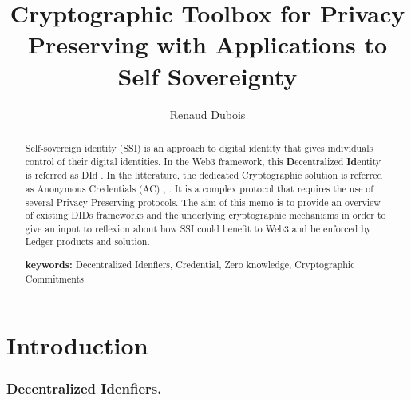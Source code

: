 \documentclass[11pt]{llncs2e/llncs}
\begin{document}
\title{Cryptographic Toolbox for Privacy Preserving with Applications to Self Sovereignty}
 
   \author{
    Renaud Dubois}
  


\maketitle


\begin{abstract}

Self-sovereign identity (SSI) is an approach to digital identity that gives individuals control of their digital identities. In the Web3 framework, this {\bf D}ecentralized {\bf Id}entity is referred as DId \cite{W3CDId21}. In the litterature, the dedicated Cryptographic solution is referred as Anonymous Credentials (AC) \cite{CL02}, \cite{CL04}. It is a complex protocol that requires the use of several Privacy-Preserving protocols. 
The aim of this memo is to provide an overview of existing DIDs frameworks and the underlying cryptographic mechanisms in order to give an input to reflexion about how SSI could benefit to Web3 and be enforced by Ledger products and solution. 

{\bf keywords:}{  Decentralized Idenfiers,  Credential, Zero knowledge, Cryptographic Commitments}
\end{abstract}

\section*{Introduction}

\subsubsection{Decentralized Idenfiers.}
\end{document}
